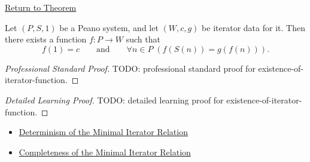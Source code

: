 \newpage
{}
\label{prf:existence-of-iterator-function}

\begin{remark*}[Return]
\hyperref[lem:existence-of-iterator-function]{Return to Theorem}
\end{remark*}

\begin{lemma*}
Let $(P,S,1)$ be a Peano system, and let $(W,c,g)$ be iterator data for it.
Then there exists a function $f:P\to W$ such that
\[
f(1)=c
\qquad\text{and}\qquad
\forall n\in P\;(f(S(n))=g(f(n))).
\]
\end{lemma*}

\begin{proof}[Professional Standard Proof]
\LRAProofBodyStart
TODO: professional standard proof for existence-of-iterator-function.
\end{proof}

\begin{proof}[Detailed Learning Proof]
\LRAProofBodyStart
TODO: detailed learning proof for existence-of-iterator-function.
\end{proof}

\begin{remark*}
\end{remark*}

\begin{dependencies}
\begin{itemize}
  \item \hyperref[lem:minimal-iterator-relation-deterministic]{Determinism of the Minimal Iterator Relation}
  \item \hyperref[lem:minimal-iterator-relation-complete]{Completeness of the Minimal Iterator Relation}
\end{itemize}
\end{dependencies}

\clearpage
